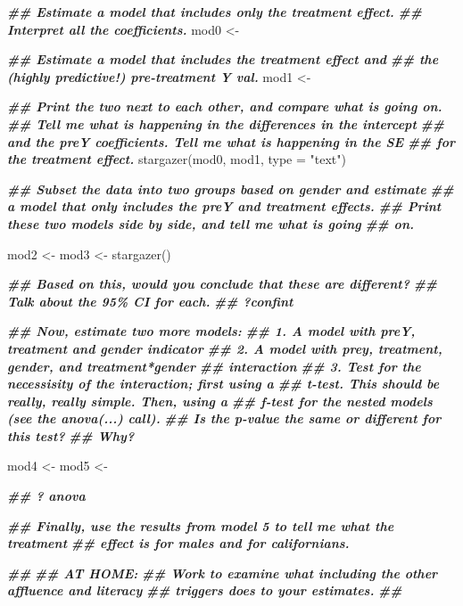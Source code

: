 \documentclass[
]{book}
\newenvironment{Shaded}{\begin{snugshade}}{\end{snugshade}}
\newcommand{\AttributeTok}[1]{\textcolor[rgb]{0.77,0.63,0.00}{#1}}
\newcommand{\DocumentationTok}[1]{\textcolor[rgb]{0.56,0.35,0.01}{\textbf{\textit{#1}}}}
\newcommand{\FunctionTok}[1]{\textcolor[rgb]{0.00,0.00,0.00}{#1}}
\newcommand{\NormalTok}[1]{#1}
\newcommand{\OtherTok}[1]{\textcolor[rgb]{0.56,0.35,0.01}{#1}}
\newcommand{\StringTok}[1]{\textcolor[rgb]{0.31,0.60,0.02}{#1}}
\begin{document}
\begin{Shaded}
\begin{Highlighting}[]
\DocumentationTok{\#\# Estimate a model that includes only the treatment effect.}
\DocumentationTok{\#\# Interpret all the coefficients. }
\NormalTok{mod0 }\OtherTok{\textless{}{-}} 

\DocumentationTok{\#\# Estimate a model that includes the treatment effect and}
\DocumentationTok{\#\# the (highly predictive!) pre{-}treatment Y val. }
\NormalTok{mod1 }\OtherTok{\textless{}{-}} 

\DocumentationTok{\#\# Print the two next to each other, and compare what is going on.}
\DocumentationTok{\#\# Tell me what is happening in the differences in the intercept}
\DocumentationTok{\#\# and the preY coefficients. Tell me what is happening in the SE}
\DocumentationTok{\#\# for the treatment effect. }
\FunctionTok{stargazer}\NormalTok{(mod0, mod1, }\AttributeTok{type =} \StringTok{"text"}\NormalTok{)}

\DocumentationTok{\#\# Subset the data into two groups based on gender and estimate}
\DocumentationTok{\#\# a model that only includes the preY and treatment effects.}
\DocumentationTok{\#\# Print these two models side by side, and tell me what is going}
\DocumentationTok{\#\# on.}

\NormalTok{mod2 }\OtherTok{\textless{}{-}} 
\NormalTok{mod3 }\OtherTok{\textless{}{-}} 
\FunctionTok{stargazer}\NormalTok{() }

\DocumentationTok{\#\# Based on this, would you conclude that these are different?}
\DocumentationTok{\#\# Talk about the 95\% CI for each.}
\DocumentationTok{\#\# ?confint}

\DocumentationTok{\#\# Now, estimate two more models:}
\DocumentationTok{\#\#  1. A model with preY, treatment and gender indicator}
\DocumentationTok{\#\#  2. A model with prey, treatment, gender, and treatment*gender}
\DocumentationTok{\#\#     interaction}
\DocumentationTok{\#\#  3. Test for the necessisity of the interaction; first using a}
\DocumentationTok{\#\#     t{-}test. This should be really, really simple. Then, using a}
\DocumentationTok{\#\#     f{-}test for the nested models (see the anova(...) call).}
\DocumentationTok{\#\#     Is the p{-}value the same or different for this test?}
\DocumentationTok{\#\#     Why? }

\NormalTok{mod4 }\OtherTok{\textless{}{-}} 
\NormalTok{mod5 }\OtherTok{\textless{}{-}} 

\DocumentationTok{\#\# ? anova}

\DocumentationTok{\#\# Finally, use the results from model 5 to tell me what the treatment}
\DocumentationTok{\#\# effect is for males and for californians.}


\DocumentationTok{\#\# }
\DocumentationTok{\#\# AT HOME:}
\DocumentationTok{\#\# Work to examine what including the other affluence and literacy}
\DocumentationTok{\#\# triggers does to your estimates.}
\DocumentationTok{\#\#}
\end{Highlighting}
\end{Shaded}
\end{document}
